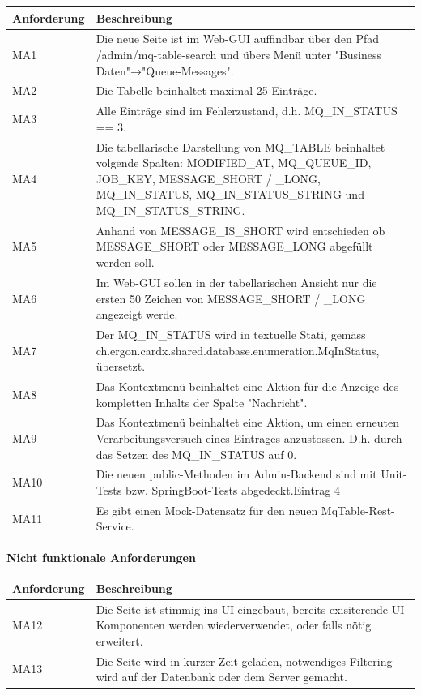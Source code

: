 \noindent \begin{tabular}{|p{3cm}|p{12cm}|}
	\hline
	\textbf{Anforderung}  & \textbf{Beschreibung} \\ \hline
	MA1    & Die neue Seite ist im Web-GUI auffindbar über den Pfad /admin/mq-table-search und übers Menü unter "Business Daten"→"Queue-Messages".     \\ \hline
	MA2    & Die Tabelle beinhaltet maximal 25 Einträge.     \\ \hline
	MA3    & Alle Einträge sind im Fehlerzustand, d.h. MQ\_IN\_STATUS == 3.     \\ \hline
	MA4    & Die tabellarische Darstellung von MQ\_TABLE beinhaltet volgende Spalten: MODIFIED\_AT, MQ\_QUEUE\_ID, JOB\_KEY, MESSAGE\_SHORT / \_LONG, MQ\_IN\_STATUS, MQ\_IN\_STATUS\_STRING und MQ\_IN\_STATUS\_STRING.    \\ \hline
	MA5    & Anhand von MESSAGE\_IS\_SHORT wird entschieden ob MESSAGE\_SHORT oder MESSAGE\_LONG abgefüllt werden soll.     \\ \hline
	MA6    & Im Web-GUI sollen in der tabellarischen Ansicht nur die ersten 50 Zeichen von MESSAGE\_SHORT / \_LONG angezeigt werde.     \\ \hline
	MA7    & Der MQ\_IN\_STATUS wird in textuelle Stati, gemäss ch.ergon.cardx.shared.database.enumeration.MqInStatus, übersetzt.      \\ \hline
	MA8    & Das Kontextmenü beinhaltet eine Aktion für die Anzeige des kompletten Inhalts der Spalte "Nachricht".     \\ \hline
	MA9    & Das Kontextmenü beinhaltet eine Aktion, um einen erneuten Verarbeitungsversuch eines Eintrages anzustossen. D.h. durch das Setzen des MQ\_IN\_STATUS auf 0.     \\ \hline
	MA10    & Die neuen public-Methoden im Admin-Backend sind mit Unit-Tests bzw. SpringBoot-Tests abgedeckt.Eintrag 4     \\ \hline
	MA11    & Es gibt einen Mock-Datensatz für den neuen MqTable-Rest-Service.     \\ \hline
\end{tabular}\newline

\noindent \textbf{Nicht funktionale Anforderungen}\newline

\noindent \begin{tabular}{|p{3cm}|p{12cm}|}
	\hline
	\textbf{Anforderung}  & \textbf{Beschreibung} \\ \hline
	MA12    & Die Seite ist stimmig ins UI eingebaut, bereits exisiterende UI-Komponenten werden wiederverwendet, oder falls nötig erweitert.     \\ \hline
	MA13    & Die Seite wird in kurzer Zeit geladen, notwendiges Filtering wird auf der Datenbank oder dem Server gemacht.     \\ \hline
\end{tabular}

